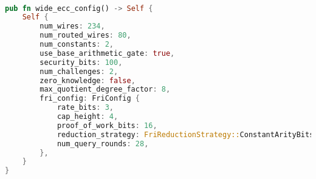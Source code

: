 
\hspace*{\fill} \\
\begin{lstlisting}[language=rust]
pub fn wide_ecc_config() -> Self {
    Self {
        num_wires: 234,
        num_routed_wires: 80,
        num_constants: 2,
        use_base_arithmetic_gate: true,
        security_bits: 100,
        num_challenges: 2,
        zero_knowledge: false,
        max_quotient_degree_factor: 8,
        fri_config: FriConfig {
            rate_bits: 3,
            cap_height: 4,
            proof_of_work_bits: 16,
            reduction_strategy: FriReductionStrategy::ConstantArityBits(4, 5),
            num_query_rounds: 28,
        },
    }
} 
\end{lstlisting}
